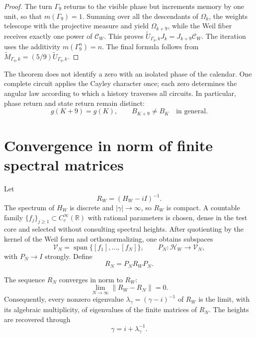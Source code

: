 \begin{proof}
The turn \(\Gamma_9\) returns to the visible phase but increments memory by
one unit, so that \(m(\Gamma_9)=1\). Summing over all the
descendants of \(\Omega_k\), the weights telescope with the projective measure
and yield \(\Omega_{k+9}\), while the Weil fiber receives exactly
one power of \(\mathcal C_W\). This proves
\(\widetilde U_{\Gamma_9,k}J_k=J_{k+9}\mathcal C_W\). The iteration uses the
additivity \(m(\Gamma_9^n)=n\). The final formula follows from
\(\widetilde M_{\Gamma_9,k}=(5/9)\widetilde U_{\Gamma_9,k}\).
\end{proof}

The theorem does not identify a zero with an isolated phase of the calendar. One
complete circuit applies the Cayley character once; each zero determines
the angular law according to which a history traverses all circuits. In
particular, phase return and state return remain distinct:
\[
 g(K+9)=g(K),
 \qquad B_{K+9}\ne B_K\quad\text{in general}.
\]

\section{Convergence in norm of finite spectral matrices}
\label{sec:cpe-convergencia-resolvente}

Let
\[
 R_W=(H_W-iI)^{-1}.
\]
The spectrum of \(H_W\) is discrete and \(|\gamma|\to\infty\), so
\(R_W\) is compact. A countable family
\(\{f_j\}_{j\ge1}\subset C_c^\infty(\mathbb R)\) with rational parameters is chosen,
dense in the test core and selected without consulting spectral heights.
After quotienting by the kernel of the Weil form and orthonormalizing, one
obtains subspaces
\[
 \mathcal V_N=\operatorname{span}\{[f_1],\ldots,[f_N]\},
 \qquad P_N:\mathcal H_W\to\mathcal V_N,
\]
with \(P_N\to I\) strongly. Define
\begin{equation}
 R_N=P_NR_WP_N.
 \label{eq:cpe-resolvente-finito}
\end{equation}

\begin{theorem}
\label{thm:cpe-convergencia-norma}
The sequence \(R_N\) converges in norm to \(R_W\):
\begin{equation}
 \boxed{\lim_{N\to\infty}\|R_W-R_N\|=0.}
 \label{eq:cpe-convergencia-norma}
\end{equation}
Consequently, every nonzero eigenvalue
\(\lambda_\gamma=(\gamma-i)^{-1}\) of \(R_W\) is the limit, with its
algebraic multiplicity, of eigenvalues of the finite matrices of
\(R_N\). The heights are recovered through
\begin{equation}
 \gamma=i+\lambda_\gamma^{-1}.
 \label{eq:cpe-recuperacion-altura}
\end{equation}
\end{theorem}


